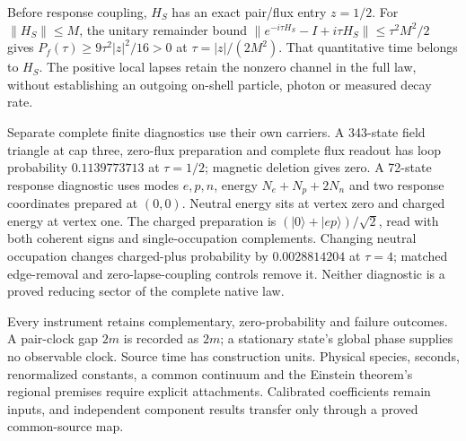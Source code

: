 Before response coupling, $H_S$ has an exact pair/flux entry $z=1/2$.
For $\|H_S\|\leq M$, the unitary remainder bound
$\|e^{-i\tau H_S}-I+i\tau H_S\|\leq\tau^2M^2/2$ gives
$P_f(\tau)\geq9\tau^2|z|^2/16>0$ at $\tau=|z|/(2M^2)$.
That quantitative time belongs to $H_S$. The positive local lapses retain
the nonzero channel in the full law, without establishing an outgoing
on-shell particle, photon or measured decay rate.

Separate complete finite diagnostics use their own carriers. A 343-state
field triangle at cap three, zero-flux preparation and complete flux readout
has loop probability $0.1139773713$ at $\tau=1/2$; magnetic deletion gives
zero. A 72-state response diagnostic uses modes $e,p,n$, energy
$N_e+N_p+2N_n$ and two response coordinates prepared at $(0,0)$.
Neutral energy sits at vertex zero and charged energy at vertex one.
The charged preparation is $(|0\rangle+|ep\rangle)/\sqrt2$, read with
both coherent signs and single-occupation complements. Changing neutral
occupation changes charged-plus probability by $0.0028814204$ at
$\tau=4$; matched edge-removal and zero-lapse-coupling controls remove it.
Neither diagnostic is a proved reducing sector of the complete native law.

Every instrument retains complementary, zero-probability and failure
outcomes. A pair-clock gap $2m$ is recorded as $2m$; a stationary
state's global phase supplies no observable clock. Source time has
construction units. Physical species, seconds, renormalized constants,
a common continuum and the Einstein theorem's regional premises require
explicit attachments. Calibrated coefficients remain inputs, and independent
component results transfer only through a proved common-source map.
